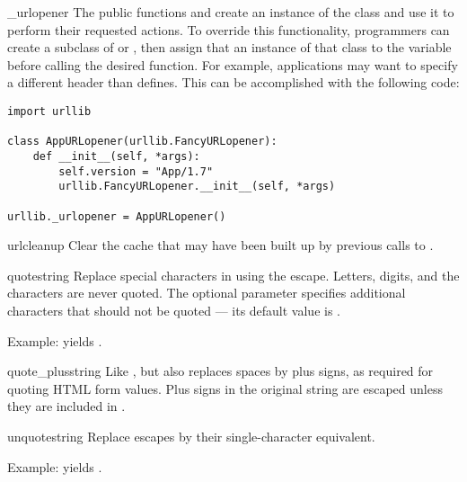 \begin{datadesc}{_urlopener}
The public functions  and
 create an instance of the
 class and use it to perform their requested
actions.  To override this functionality, programmers can create a
subclass of  or , then assign
that an instance of that class to the
 variable before calling the desired function.
For example, applications may want to specify a different
 header than  defines.  This
can be accomplished with the following code:

\begin{verbatim}
import urllib

class AppURLopener(urllib.FancyURLopener):
    def __init__(self, *args):
        self.version = "App/1.7"
        urllib.FancyURLopener.__init__(self, *args)

urllib._urlopener = AppURLopener()
\end{verbatim}
\end{datadesc}

\begin{funcdesc}{urlcleanup}{}
Clear the cache that may have been built up by previous calls to
.
\end{funcdesc}

\begin{funcdesc}{quote}{string}
Replace special characters in  using the  escape.
Letters, digits, and the characters  are never quoted.
The optional  parameter specifies additional characters
that should not be quoted --- its default value is .

Example:  yields .
\end{funcdesc}

\begin{funcdesc}{quote_plus}{string}
Like , but also replaces spaces by plus signs, as
required for quoting HTML form values.  Plus signs in the original
string are escaped unless they are included in .
\end{funcdesc}

\begin{funcdesc}{unquote}{string}
Replace  escapes by their single-character equivalent.

Example:  yields .
\end{funcdesc}


